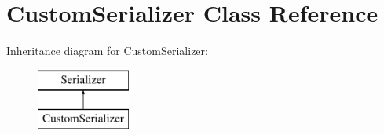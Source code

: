 \hypertarget{classCustomSerializer}{}\section{Custom\+Serializer Class Reference}
\label{classCustomSerializer}
Inheritance diagram for Custom\+Serializer\+:\begin{figure}[H]
\begin{center}
\leavevmode
\includegraphics[height=2.000000cm]{classCustomSerializer}
\end{center}
\end{figure}
